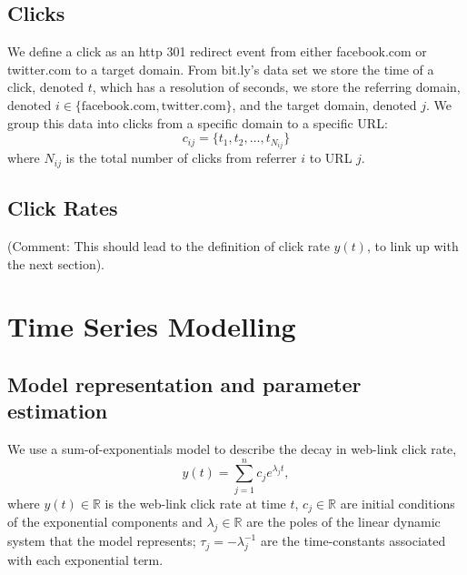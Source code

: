 \documentclass{article}
\begin{document}
    \subsection{Clicks}
    
    We define a click as an http 301 redirect event from either facebook.com or twitter.com to a target domain. From bit.ly's data set we store the time of a click, denoted $t$, which has a resolution of seconds, we store the referring domain, denoted $i \in \{\textrm{facebook.com}, \textrm{twitter.com} \}$, and the target domain, denoted $j$. We group this data into clicks from a specific domain to a specific URL: 
    \begin{equation}
        c_{ij} = \{t_1, t_2, \ldots, t_{N_{ij}}\}
    \end{equation}
    where $N_{ij}$ is the total number of clicks from referrer $i$ to URL $j$. 
    
    
\subsection{Click Rates}
    
    (Comment: This should lead to the definition of click rate $y(t)$, to link up with the next section).
    
\section{Time Series Modelling}
    
\subsection{Model representation and parameter estimation}
    

We use a sum-of-exponentials model to describe the decay in web-link click rate,
\begin{equation} \label{eqn:exp}
y(t) = \sum_{j=1}^{n} c_j e^{\lambda_j t} ,
\end{equation}
where $y(t) \in \mathbb{R}$ is the web-link click rate at time $t$, $c_j \in \mathbb{R}$ are initial conditions of the exponential components and $\lambda_j \in \mathbb{R}$ are the poles of the linear dynamic system that the model represents; $\tau_j = -\lambda_j^{-1}$ are the time-constants associated with each exponential term. 
\end{document}
